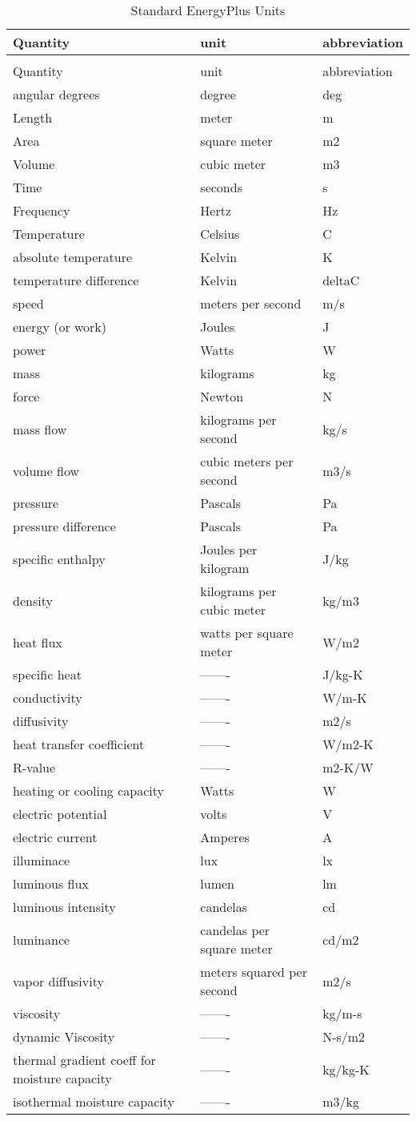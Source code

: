 \begin{longtable}[c]{p{1.59in}p{2.9in}p{1.5in}}
\caption{Standard EnergyPlus Units \label{table:standard-energyplus-units}} \tabularnewline
\toprule
Quantity & unit & abbreviation \tabularnewline
\midrule
\endfirsthead

\caption[]{Standard EnergyPlus Units} \tabularnewline
\toprule
Quantity & unit & abbreviation \tabularnewline
\midrule
\endhead

angular degrees & degree & deg \tabularnewline
Length & meter & m \tabularnewline
Area & square meter & m2 \tabularnewline
Volume & cubic meter & m3 \tabularnewline
Time & seconds & s \tabularnewline
Frequency & Hertz & Hz \tabularnewline
Temperature & Celsius & C \tabularnewline
absolute temperature & Kelvin & K \tabularnewline
temperature difference & Kelvin & deltaC \tabularnewline
speed & meters per second & m/s \tabularnewline
energy (or work) & Joules & J \tabularnewline
power & Watts & W \tabularnewline
mass & kilograms & kg \tabularnewline
force & Newton & N \tabularnewline
mass flow & kilograms per second & kg/s \tabularnewline
volume flow & cubic meters per second & m3/s \tabularnewline
pressure & Pascals & Pa \tabularnewline
pressure difference & Pascals & Pa \tabularnewline
specific enthalpy & Joules per kilogram & J/kg \tabularnewline
density & kilograms per cubic meter & kg/m3 \tabularnewline
heat flux & watts per square meter & W/m2 \tabularnewline
specific heat & ------- & J/kg-K \tabularnewline
conductivity & ------- & W/m-K \tabularnewline
diffusivity & ------- & m2/s \tabularnewline
heat transfer coefficient & ------- & W/m2-K \tabularnewline
R-value & ------- & m2-K/W \tabularnewline
heating or cooling capacity & Watts & W \tabularnewline
electric potential & volts & V \tabularnewline
electric current & Amperes & A \tabularnewline
illuminace & lux & lx \tabularnewline
luminous flux & lumen & lm \tabularnewline
luminous intensity & candelas & cd \tabularnewline
luminance & candelas per square meter & cd/m2 \tabularnewline
vapor diffusivity & meters squared per second & m2/s \tabularnewline
viscosity & ------- & kg/m-s \tabularnewline
dynamic Viscosity & ------- & N-s/m2 \tabularnewline
thermal gradient coeff for moisture capacity & ------- & kg/kg-K \tabularnewline
isothermal moisture capacity & ------- & m3/kg \tabularnewline
\bottomrule
\end{longtable}